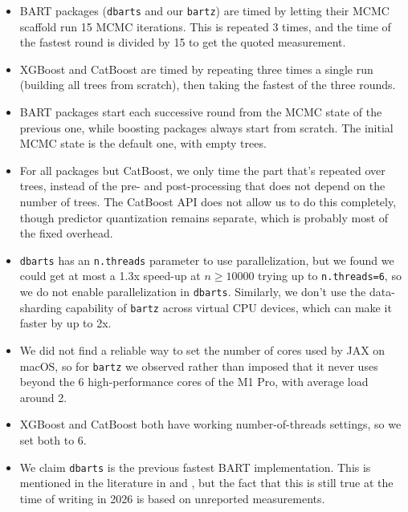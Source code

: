 \documentclass{article}
\begin{document}
\begin{itemize}

	\item BART packages (\texttt{dbarts} and our \texttt{bartz}) are timed
		by letting their MCMC scaffold run 15 MCMC iterations. This is
		repeated 3 times, and the time of the fastest round is divided
		by 15 to get the quoted measurement.

	\item XGBoost and CatBoost are timed by repeating three times a single
		run (building all trees from scratch), then taking the fastest
		of the three rounds.
	
	\item BART packages start each successive round from the MCMC state of
		the previous one, while boosting packages always start from
		scratch. The initial MCMC state is the default one, with empty
		trees.

	\item For all packages but CatBoost, we only time the part that's
		repeated over trees, instead of the pre- and post-processing
		that does not depend on the number of trees. The CatBoost API
		does not allow us to do this completely, though predictor
		quantization remains separate, which is probably most of the
		fixed overhead.

	\item \texttt{dbarts} has an \texttt{n.threads} parameter to use
		parallelization, but we found we could get at most a 1.3x
		speed-up at $n \ge \num{10000}$ trying up to \texttt{n.threads=6}, so we do not enable
		parallelization in \texttt{dbarts}. Similarly, we don't
		use the data-sharding capability of \texttt{bartz} across
		virtual CPU devices, which can make it faster by up to 2x.

	\item We did not find a reliable way to set the number of cores used by
		JAX on macOS, so for \texttt{bartz} we observed rather than
		imposed that it never uses beyond the 6 high-performance cores
		of the M1 Pro, with average load around 2.

	\item XGBoost and CatBoost both have working number-of-threads
		settings, so we set both to 6.
	
	\item We claim \texttt{dbarts} is the previous fastest BART
		implementation. This is mentioned in the literature in
		\textcite[\S1]{he2019} and \textcite[\S D.3,
		p.~61]{sparapani2021}, but the fact that this is still true at
		the time of writing in 2026 is based on unreported
		measurements.
	

\end{itemize}
\end{document}
